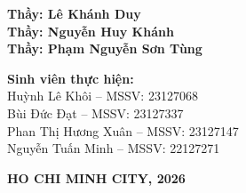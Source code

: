 \documentclass[12pt,a4paper]{article}
\begin{document}
\begin{titlepage}
\begin{center}
    \vspace{10pt}
    
    
    \vspace{1.5cm}

    \begin{tcolorbox}[colback=blue!5!white, colframe=blue!50!black, width=0.9\textwidth, boxrule=0.8pt, arc=3pt, left=8pt, right=8pt]
        \textbf{Thầy: Lê Khánh Duy}\\
        \textbf{Thầy: Nguyễn Huy Khánh}\\
        \textbf{Thầy: Phạm Nguyễn Sơn Tùng}
    \end{tcolorbox}
    \vspace{1cm}

    \begin{tcolorbox}[colback=gray!10!white, colframe=gray!60!black, width=0.9\textwidth, boxrule=0.8pt, arc=3pt, left=8pt, right=8pt]
        \textbf{Sinh viên thực hiện:} \\
        Huỳnh Lê Khôi -- MSSV: 23127068 \\ 
        Bùi Đức Đạt -- MSSV: 23127337 \\
        Phan Thị Hương Xuân -- MSSV: 23127147 \\
        Nguyễn Tuấn Minh -- MSSV: 22127271
        
    \end{tcolorbox}

    \vfill
    {\large\textbf{HO CHI MINH CITY, 2026}}
\end{center}
\end{titlepage}


\tableofcontents        %
\newpage                %



\end{document}
